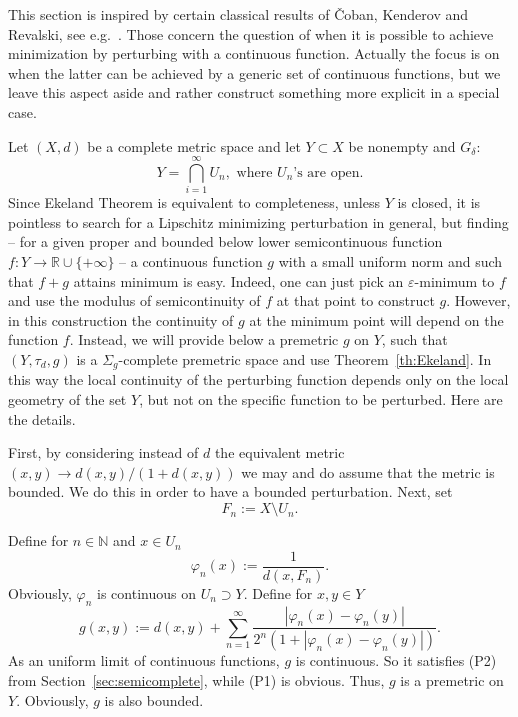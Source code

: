 \documentclass[12pt]{article}
\begin{document}
    This section is inspired by certain classical results of \v{C}oban, Kenderov and Revalski, see e.g.~\cite{Coban_Kenderov_Revalski}. Those concern the question of when it is possible to achieve minimization by perturbing with a continuous function. Actually the focus is on when the latter can be achieved by a generic set of continuous functions, but we leave this aspect aside and rather construct something more explicit in a special case.

    Let $(X,d)$ be a complete metric space and let $Y\subset X$ be nonempty and $G_\delta$:
    $$
        Y = \bigcap_{i=1}^\infty U_n,\text{ where }U_n\text{'s are open.}
    $$
    Since Ekeland Theorem is equivalent to completeness, unless $Y$ is closed, it is pointless to search for a Lipschitz minimizing perturbation in general, but finding -- for a given proper and bounded below lower semicontinuous function $f:Y\to\mathbb{R}\cup\{+\infty\}$ -- a continuous function $g$ with a small uniform norm and such that $f+g$ attains minimum is easy. Indeed, one can just pick an $\varepsilon$-minimum to $f$ and use the modulus of semicontinuity of $f$ at that point to construct $g$. However, in this construction the continuity of $g$ at the minimum point will depend on the function $f$. Instead, we will provide below a premetric $g$ on $Y$, such that $(Y,\tau_d,g)$ is a  $\Sigma_g$-complete premetric space and use Theorem~\ref{th:Ekeland}. In this way the local continuity of the perturbing function depends only on the local geometry of the set $Y$, but not on the specific function to be perturbed. Here are the details.

    First, by considering instead of $d$ the equivalent metric $(x,y)\to d(x,y)/(1+d(x,y))$ we may and do assume that the metric is bounded. We do this in order to have a bounded perturbation. Next, set
     $$
        F_n := X\setminus U_n.
    $$

    Define for $n\in\mathbb{N}$ and $x\in U_n$
    $$
        \varphi_n (x) := \frac{1}{d(x,F_n)}.
    $$
    Obviously, $\varphi_n$ is continuous on $U_n\supset Y$. 
    Define for $x,y\in Y$
    \begin{equation}
        \label{eq:gd-g-def}
        g(x,y) := d(x,y) + \sum_{n=1}^\infty \frac{|\varphi_n(x)-\varphi_n(y)|}{2^n(1+|\varphi_n(x)-\varphi_n(y)|)}.
    \end{equation}
    As an uniform limit of continuous functions, $g$ is continuous. So it satisfies (P2) from Section~\ref{sec:semicomplete}, while (P1) is obvious. Thus, $g$ is a premetric on $Y$. Obviously, $g$ is also bounded.
\end{document}
